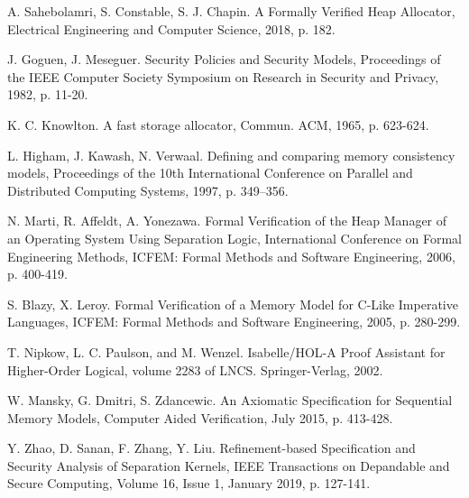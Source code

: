 \documentclass[runningheads]{llncs}
\begin{document}
\begin{thebibliography}{8}
A. Sahebolamri, S. Constable, S. J. Chapin. A Formally Verified Heap Allocator, Electrical Engineering and Computer Science, 2018, p. 182.
	

J. Goguen, J. Meseguer. Security Policies and Security Models, Proceedings of the IEEE Computer Society Symposium on Research in Security and Privacy, 1982, p. 11-20.

K. C. Knowlton. A fast storage allocator, Commun. ACM, 1965, p. 623-624.

L. Higham, J. Kawash, N. Verwaal. Defining and comparing memory consistency
models, Proceedings of the 10th International Conference on Parallel and Distributed Computing Systems, 1997, p. 349–356.

N. Marti, R. Affeldt, A. Yonezawa. Formal Verification of the Heap Manager of an Operating System Using Separation Logic, International Conference on Formal Engineering Methods, ICFEM: Formal Methods and Software Engineering, 2006, p. 400-419.

S. Blazy, X. Leroy. Formal Verification of a Memory Model for C-Like Imperative Languages, ICFEM: Formal Methods and Software Engineering, 2005, p. 280-299.

T. Nipkow, L. C. Paulson, and M. Wenzel. Isabelle/HOL-A Proof Assistant for Higher-Order Logical, volume 2283 of LNCS. Springer-Verlag, 2002.

W. Mansky, G. Dmitri, S. Zdancewic. An Axiomatic Specification for Sequential Memory Models, Computer Aided Verification, July 2015, p. 413-428.

Y. Zhao, D. Sanan, F. Zhang, Y. Liu. Refinement-based Specification and Security Analysis of Separation Kernels, IEEE Transactions on Depandable and Secure Computing, Volume 16, Issue 1, January 2019, p. 127-141.
\end{thebibliography}
\end{document}
